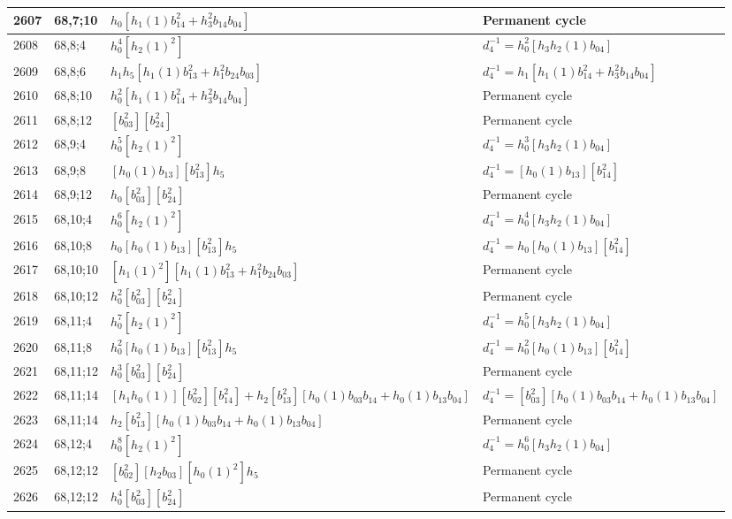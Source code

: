 \documentclass{article}
\begin{document}
\begin{longtable}{|l|l|>{\raggedright\arraybackslash}p{6cm}|>{\raggedright\arraybackslash}p{6cm}|}
\hline
2607 & 68,7;10 & $h_0[h_1(1)b_{14}^2 + h_3^2b_{14}b_{04}]$ & Permanent cycle\\
\hline
2608 & 68,8;4 & $h_0^4[h_2(1)^2]$ & $d_{4}^{-1}=h_0^2[h_3h_2(1)b_{04}]$\\
\hline
2609 & 68,8;6 & $h_1h_5[h_1(1)b_{13}^2 + h_1^2b_{24}b_{03}]$ & $d_{4}^{-1}=h_1[h_1(1)b_{14}^2 + h_3^2b_{14}b_{04}]$\\
\hline
2610 & 68,8;10 & $h_0^2[h_1(1)b_{14}^2 + h_3^2b_{14}b_{04}]$ & Permanent cycle\\
\hline
2611 & 68,8;12 & $[b_{03}^2][b_{24}^2]$ & Permanent cycle\\
\hline
2612 & 68,9;4 & $h_0^5[h_2(1)^2]$ & $d_{4}^{-1}=h_0^3[h_3h_2(1)b_{04}]$\\
\hline
2613 & 68,9;8 & $[h_0(1)b_{13}][b_{13}^2]h_5$ & $d_{4}^{-1}=[h_0(1)b_{13}][b_{14}^2]$\\
\hline
2614 & 68,9;12 & $h_0[b_{03}^2][b_{24}^2]$ & Permanent cycle\\
\hline
2615 & 68,10;4 & $h_0^6[h_2(1)^2]$ & $d_{4}^{-1}=h_0^4[h_3h_2(1)b_{04}]$\\
\hline
2616 & 68,10;8 & $h_0[h_0(1)b_{13}][b_{13}^2]h_5$ & $d_{4}^{-1}=h_0[h_0(1)b_{13}][b_{14}^2]$\\
\hline
2617 & 68,10;10 & $[h_1(1)^2][h_1(1)b_{13}^2 + h_1^2b_{24}b_{03}]$ & Permanent cycle\\
\hline
2618 & 68,10;12 & $h_0^2[b_{03}^2][b_{24}^2]$ & Permanent cycle\\
\hline
2619 & 68,11;4 & $h_0^7[h_2(1)^2]$ & $d_{4}^{-1}=h_0^5[h_3h_2(1)b_{04}]$\\
\hline
2620 & 68,11;8 & $h_0^2[h_0(1)b_{13}][b_{13}^2]h_5$ & $d_{4}^{-1}=h_0^2[h_0(1)b_{13}][b_{14}^2]$\\
\hline
2621 & 68,11;12 & $h_0^3[b_{03}^2][b_{24}^2]$ & Permanent cycle\\
\hline
2622 & 68,11;14 & $[h_1h_0(1)][b_{02}^2][b_{14}^2] + h_2[b_{13}^2][h_0(1)b_{03}b_{14} + h_0(1)b_{13}b_{04}]$ & $d_{4}^{-1}=[b_{03}^2][h_0(1)b_{03}b_{14} + h_0(1)b_{13}b_{04}]$\\
2623 & 68,11;14 & $h_2[b_{13}^2][h_0(1)b_{03}b_{14} + h_0(1)b_{13}b_{04}]$ & Permanent cycle\\
\hline
2624 & 68,12;4 & $h_0^8[h_2(1)^2]$ & $d_{4}^{-1}=h_0^6[h_3h_2(1)b_{04}]$\\
\hline
2625 & 68,12;12 & $[b_{02}^2][h_2b_{03}][h_0(1)^2]h_5$ & Permanent cycle\\
2626 & 68,12;12 & $h_0^4[b_{03}^2][b_{24}^2]$ & Permanent cycle\\

\end{longtable}
\end{document}
